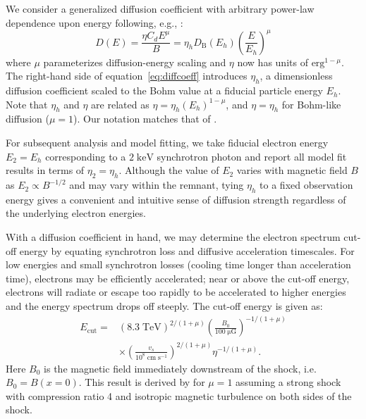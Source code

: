 \documentclass[iop, apj, numberedappendix]{emulateapj}
\newcommand*{\mt}{\mathrm}
\newcommand*{\unit}[1]{\;\mt{#1}}  %
\newcommand*{\Ecut}{E_{\mt{cut}}}
\newcommand*{\muG}{\unit{\mu G}}
\begin{document}
We consider a generalized diffusion coefficient with arbitrary
power-law dependence upon energy following, e.g., \citet{parizot2006}:
\begin{equation} \label{eq:diffcoeff}
    D(E) = \frac{\eta C_d E^\mu}{B}
         = \eta_h D_{\mt{B}}\left(E_h\right) \left(\frac{E}{E_h}\right)^\mu
\end{equation}
where $\mu$ parameterizes diffusion-energy scaling and $\eta$ now has units
of $\mt{erg}^{1-\mu}$.  The right-hand side of equation~\eqref{eq:diffcoeff}
introduces $\eta_h$, a dimensionless diffusion coefficient scaled to the Bohm
value at a fiducial particle energy $E_h$.  Note that $\eta_h$ and $\eta$ are
related as $\eta = \eta_h (E_h)^{1-\mu}$, and $\eta = \eta_h$ for Bohm-like
diffusion ($\mu = 1$).  Our notation matches that of .

For subsequent analysis and model fitting, we take fiducial electron energy
$E_2 = E_h$ corresponding to a $2 \unit{keV}$ synchrotron photon and report all
model fit results in terms of $\eta_2 = \eta_h$.  Although the value of $E_2$
varies with magnetic field $B$ as $E_2 \propto B^{-1/2}$ and may vary within
the remnant, tying $\eta_h$ to a fixed observation energy gives a convenient
and intuitive sense of diffusion strength regardless of the underlying electron
energies.

With a diffusion coefficient in hand, we may determine the electron spectrum
cut-off energy by equating synchrotron loss and diffusive acceleration
timescales.  For low energies and small synchrotron losses (cooling time longer
than acceleration time), electrons may be efficiently accelerated; near or
above the cut-off energy, electrons will radiate or escape too rapidly to be
accelerated to higher energies and the energy spectrum drops off steeply.  The
cut-off energy is given as:
\begin{align} \label{eq:ecut}
    \Ecut =
        &\left(8.3\unit{TeV}\right)^{2/(1+\mu)}
        \left(\frac{B_0}{100 \muG}\right)^{-1/(1+\mu)} \nonumber \\
        &\times \left(\frac{v_s}{10^8 \unit{cm\;s^{-1}}}\right)^{2/(1+\mu)}
        \eta^{-1 / (1+\mu)} .
\end{align}
Here $B_0$ is the magnetic field immediately downstream of the shock, i.e.
$B_0 = B(x=0)$.
This result is derived by \citet{parizot2006} for $\mu=1$ assuming a strong
shock with compression ratio 4 and isotropic magnetic turbulence on both sides
of the shock.
\end{document}
